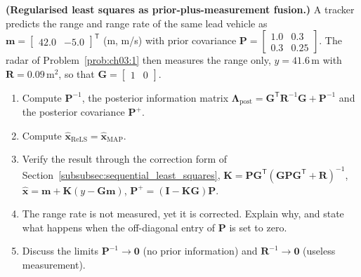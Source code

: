 \begin{prob}\label{prob:ch03:2}
\textbf{(Regularised least squares as prior-plus-measurement fusion.)} A tracker predicts the range and range rate of the same lead vehicle as $\mathbf{m}=\begin{bmatrix}42.0 & -5.0\end{bmatrix}^{\mathsf T}$ (m, m/s) with prior covariance
$\mathbf{P}=\begin{bmatrix}1.0&0.3\\0.3&0.25\end{bmatrix}$.
The radar of Problem~\ref{prob:ch03:1} then measures the range only, $y=41.6$\,m with $\mathbf{R}=0.09$\,m$^{2}$, so that $\mathbf{G}=\begin{bmatrix}1&0\end{bmatrix}$.
\begin{enumerate}
\item[(a)] Compute $\mathbf{P}^{-1}$, the posterior information matrix $\mathbf{\Lambda}_{\mathrm{post}}=\mathbf{G}^{\mathsf T}\mathbf{R}^{-1}\mathbf{G}+\mathbf{P}^{-1}$ and the posterior covariance $\mathbf{P}^{+}$.
\item[(b)] Compute $\widehat{\mathbf{x}}_{\mathrm{ReLS}}=\widehat{\mathbf{x}}_{\mathrm{MAP}}$.
\item[(c)] Verify the result through the correction form of Section~\ref{subsubsec:sequential_least_squares}, $\mathbf{K}=\mathbf{P}\mathbf{G}^{\mathsf T}(\mathbf{G}\mathbf{P}\mathbf{G}^{\mathsf T}+\mathbf{R})^{-1}$, $\widehat{\mathbf{x}}=\mathbf{m}+\mathbf{K}(y-\mathbf{G}\mathbf{m})$, $\mathbf{P}^{+}=(\mathbf{I}-\mathbf{K}\mathbf{G})\mathbf{P}$.
\item[(d)] The range rate is not measured, yet it is corrected. Explain why, and state what happens when the off-diagonal entry of $\mathbf{P}$ is set to zero.
\item[(e)] Discuss the limits $\mathbf{P}^{-1}\to\mathbf{0}$ (no prior information) and $\mathbf{R}^{-1}\to\mathbf{0}$ (useless measurement).
\end{enumerate}
\end{prob}

